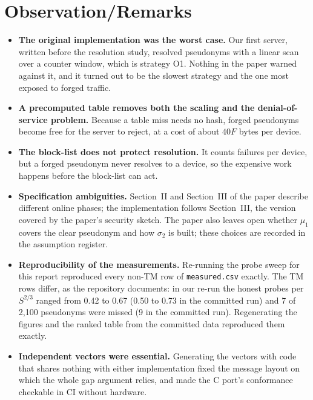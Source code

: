 \section{Observation/Remarks}
\begin{itemize}
\item \textbf{The original implementation was the worst case.} Our first server, written before the resolution study, resolved pseudonyms with a linear scan over a counter window, which is strategy O1. Nothing in the paper warned against it, and it turned out to be the slowest strategy and the one most exposed to forged traffic.
\item \textbf{A precomputed table removes both the scaling and the denial-of-service problem.} Because a table miss needs no hash, forged pseudonyms become free for the server to reject, at a cost of about $40F$ bytes per device.
\item \textbf{The block-list does not protect resolution.} It counts failures per device, but a forged pseudonym never resolves to a device, so the expensive work happens before the block-list can act.
\item \textbf{Specification ambiguities.} Section~II and Section~III of the paper describe different online phases; the implementation follows Section~III, the version covered by the paper's security sketch. The paper also leaves open whether $\mu_1$ covers the clear pseudonym and how $\sigma_2$ is built; these choices are recorded in the assumption register.
\item \textbf{Reproducibility of the measurements.} Re-running the probe sweep for this report reproduced every non-TM row of \texttt{measured.csv} exactly. The TM rows differ, as the repository documents: in our re-run the honest probes per $S^{2/3}$ ranged from 0.42 to 0.67 (0.50 to 0.73 in the committed run) and 7 of 2,100 pseudonyms were missed (9 in the committed run). Regenerating the figures and the ranked table from the committed data reproduced them exactly.
\item \textbf{Independent vectors were essential.} Generating the vectors with code that shares nothing with either implementation fixed the message layout on which the whole gap argument relies, and made the C port's conformance checkable in CI without hardware.
\end{itemize}

